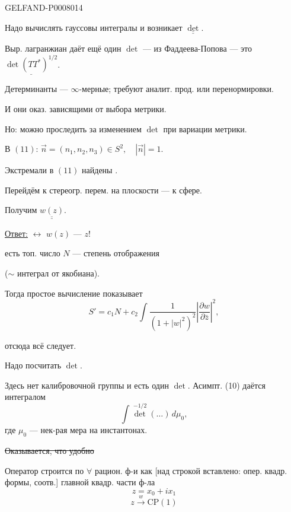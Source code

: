 \begin{GelfandAdjacentEvidence}{GELFAND-P000801}{4}


Надо вычислять гауссовы интегралы и возникает \(\underline{\underline{\det}}\).

Выр. лагранжиан даёт ещё один \(\det\) --- из Фаддеева-Попова --- это \(\underline{\det(TT^*)^{1/2}}\).

Детерминанты --- \(\infty\)-мерные; требуют аналит. прод. или перенормировки.

И они оказ. зависящими от выбора метрики.

Но: можно проследить за изменением \(\det\) при вариации метрики.

В \((11)\): \(\vec n=(n_1,n_2,n_3)\in S^2,\quad |\vec n|=1\).

Экстремали в \((11)\) найдены .

Перейдём к стереогр. перем. на плоскости --- к сфере.

Получим \(\underline{\underline{w(z)}}\).

\underline{Ответ:} 
\(\leftrightarrow\) \(w(z)\) ---  \(z\)!

 есть топ. число \(N\) --- степень отображения

(\(\sim\) интеграл от якобиана).

Тогда простое вычисление показывает
\begin{equation*}
S'=c_1N+c_2\int\frac{1}{(1+|w|^2)^2}
\left|\frac{\partial w}{\partial\bar z}\right|^2,
\tag{12}
\end{equation*}
\end{GelfandAdjacentEvidence}


отсюда всё следует.

Надо посчитать \(\det\).

Здесь нет калибровочной группы и есть один \(\det\). Асимпт. (10) даётся интегралом
\begin{equation*}
\int\det^{-1/2}(\ldots)\,d\mu_0,
\tag{13}
\end{equation*}
где \(\mu_0\) --- нек-рая мера на инстантонах.

\sout{Оказывается, что удобно}

Оператор строится по \(\forall\) рацион. ф-и как
[над строкой вставлено: опер. квадр. формы, соотв.] главной квадр. части ф-ла
\[
z=x_0+ix_1
\]
\begin{equation*}
z\xrightarrow{w}\mathrm{CP}(1)
\tag{14}
\end{equation*}


